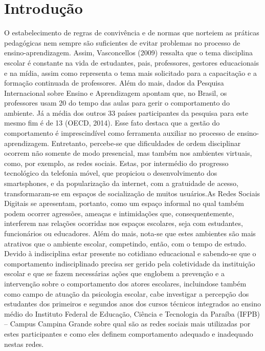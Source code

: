 \section{Introdução}
O estabelecimento de regras de convivência e de normas que norteiem as práticas pedagógicas nem sempre são suficientes de evitar problemas no processo de ensino-aprendizagem. Assim, Vasconcellos (2009) ressalta que o tema disciplina escolar é constante na vida de estudantes, pais, professores, gestores educacionais e na mídia, assim como representa o tema mais solicitado para a capacitação e a formação continuada de professores. Além do mais, dados da Pesquisa Internacional sobre Ensino e Aprendizagem apontam que, no Brasil, os professores usam 20 do tempo das aulas para gerir o comportamento do ambiente. Já a média dos outros 33 países participantes da pesquisa para este mesmo fim é de 13 (OECD, 2014). Esse fato destaca que a gestão do comportamento é imprescindível como ferramenta auxiliar no processo
de ensino-aprendizagem. Entretanto, percebe-se que dificuldades de ordem disciplinar ocorrem não somente de modo presencial, mas também nos ambientes virtuais, como, por exemplo, as redes sociais. Estas, por intermédio do progresso tecnológico da telefonia móvel, que propiciou o desenvolvimento dos smartsphones, e da popularização da internet, com a gratuidade de acesso, transformaram-se em espaços de socialização de muitos usuários.As Redes Sociais Digitais se apresentam, portanto, como um espaço informal no qual também podem ocorrer agressões, ameaças e intimidações que, consequentemente, interferem nas relações ocorridas nos espaços escolares, seja com estudantes, funcionários ou educadores. Além do mais, nota-se que estes ambientes são mais atrativos que o ambiente escolar, competindo, então, com o tempo de estudo. Devido à indisciplina estar presente no cotidiano educacional e sabendo-se que o comportamento indisciplinado precisa ser gerido pela coletividade da instituição escolar e que se fazem necessárias ações que englobem a prevenção e a intervenção sobre o comportamento dos atores escolares, incluindose também como campo de atuação da psicologia escolar, cabe investigar a percepção dos estudantes dos primeiros e segundos anos dos cursos técnicos integrados ao ensino médio do Instituto Federal de Educação, Ciência e Tecnologia da Paraíba (IFPB) – Campus Campina Grande sobre qual são as redes sociais mais utilizadas por estes participantes e como eles definem comportamento adequado e inadequado nestas redes.
